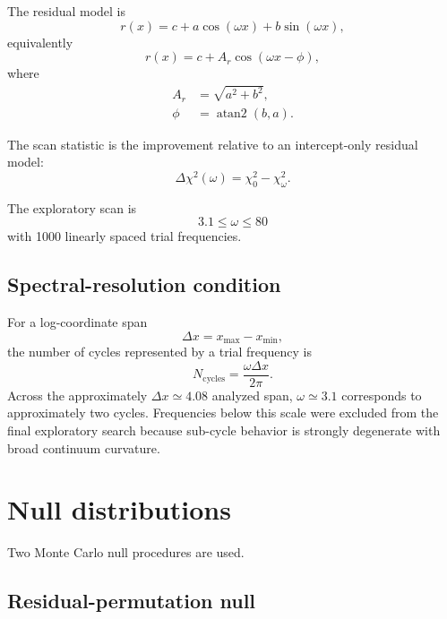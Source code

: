 \documentclass[11pt]{article}
\begin{document}
The residual model is
\begin{equation}
r(x)
=
c
+
a\cos(\omega x)
+
b\sin(\omega x),
\label{eq:linmodel}
\end{equation}
equivalently
\begin{equation}
r(x)
=
c
+
A_r\cos(\omega x-\phi),
\end{equation}
where
\begin{align}
A_r &= \sqrt{a^2+b^2},\\
\phi &= \operatorname{atan2}(b,a).
\end{align}

The scan statistic is the improvement relative to an intercept-only residual
model:
\begin{equation}
\Delta\chi^2(\omega)
=
\chi^2_0-\chi^2_\omega.
\end{equation}

The exploratory scan is
\begin{equation}
3.1\le\omega\le80
\end{equation}
with 1000 linearly spaced trial frequencies.

\subsection{Spectral-resolution condition}

For a log-coordinate span
\begin{equation}
\Delta x=x_{\max}-x_{\min},
\end{equation}
the number of cycles represented by a trial frequency is
\begin{equation}
N_{\mathrm{cycles}}
=
\frac{\omega\Delta x}{2\pi}.
\label{eq:ncycles}
\end{equation}
Across the approximately
\(\Delta x\simeq4.08\) analyzed span, \(\omega\simeq3.1\) corresponds to
approximately two cycles.  Frequencies below this scale were excluded from the
final exploratory search because sub-cycle behavior is strongly degenerate
with broad continuum curvature.

\section{Null distributions}

Two Monte Carlo null procedures are used.

\subsection{Residual-permutation null}
\end{document}
